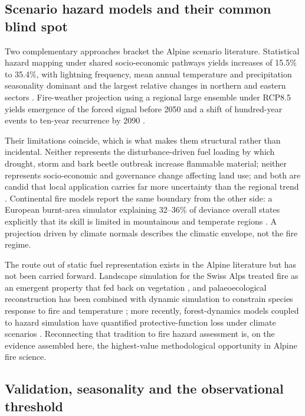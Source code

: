 \documentclass[11pt,a4paper]{article}
\begin{document}
\subsection{Scenario hazard models and their common blind spot}

Two complementary approaches bracket the Alpine scenario literature. Statistical hazard mapping under shared socio-economic pathways yields increases of 15.5\% to 35.4\%, with lightning frequency, mean annual temperature and precipitation seasonality dominant and the largest relative changes in northern and eastern sectors \citep{gerberding_mapping_2025}. Fire-weather projection using a regional large ensemble under RCP8.5 yields emergence of the forced signal before 2050 and a shift of hundred-year events to ten-year recurrence by 2090 \citep{miller_climate_2024}.

Their limitations coincide, which is what makes them structural rather than incidental. Neither represents the disturbance-driven fuel loading by which drought, storm and bark beetle outbreak increase flammable material; neither represents socio-economic and governance change affecting land use; and both are candid that local application carries far more uncertainty than the regional trend \citep{gerberding_mapping_2025}. Continental fire models report the same boundary from the other side: a European burnt-area simulator explaining 32--36\% of deviance overall states explicitly that its skill is limited in mountainous and temperate regions \citep{forrest_understanding_2024}. A projection driven by climate normals describes the climatic envelope, not the fire regime.

The route out of static fuel representation exists in the Alpine literature but has not been carried forward. Landscape simulation for the Swiss Alps treated fire as an emergent property that fed back on vegetation \citep{schumacher_relative_2006}, and palaeoecological reconstruction has been combined with dynamic simulation to constrain species response to fire and temperature \citep{colombaroli_species_2010}; more recently, forest-dynamics models coupled to hazard simulation have quantified protective-function loss under climate scenarios \citep{hillebrand_contrasting_2023, moos_climate_2021}. Reconnecting that tradition to fire hazard assessment is, on the evidence assembled here, the highest-value methodological opportunity in Alpine fire science.

\subsection{Validation, seasonality and the observational threshold}
\end{document}
